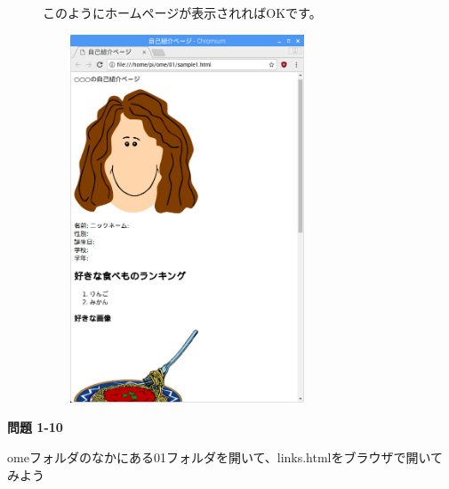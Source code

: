 \documentclass[a4paper,12pt]{jarticle}
\begin{document}
\begin{figure}[hb]
\centering
\begin{minipage}{16.574cm}
このようにホームページが表示されればOKです。

\centering
\includegraphics[width=8.588cm,height=10.933cm]{textbook-img142.png}
\end{minipage}

\end{figure}
{\bfseries
問題 1-10}

omeフォルダのなかにある01フォルダを開いて、links.htmlをブラウザで開いてみよう


\bigskip

\vfill
\end{document}
